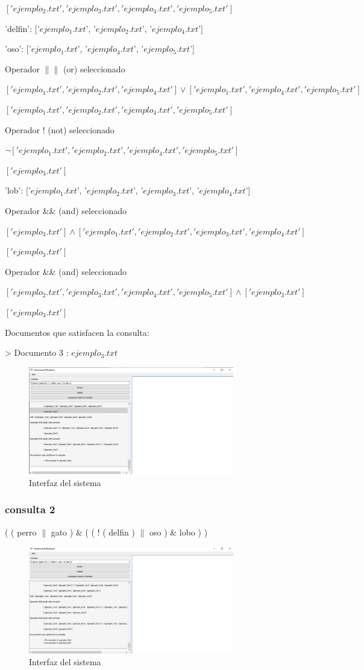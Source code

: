 $['ejemplo_2.txt', 'ejemplo_3.txt', 'ejemplo_4.txt', 'ejemplo_5.txt']$

'delfin': ['$ejemplo_1.txt$', '$ejemplo_2.txt$', '$ejemplo_4.txt$']

'oso': ['$ejemplo_1.txt$', '$ejemplo_4.txt$', '$ejemplo_5.txt$']

Operador $\|\|$ (or) seleccionado

$['ejemplo_1.txt', 'ejemplo_2.txt', 'ejemplo_4.txt'] \lor ['ejemplo_1.txt', 'ejemplo_4.txt', 'ejemplo_5.txt']$

$['ejemplo_1.txt', 'ejemplo_2.txt', 'ejemplo_4.txt', 'ejemplo_5.txt']$

Operador ! (not) seleccionado

$\neg['ejemplo_1.txt', 'ejemplo_2.txt', 'ejemplo_4.txt', 'ejemplo_5.txt']$

$['ejemplo_3.txt']$

'lob': ['$ejemplo_1.txt$', '$ejemplo_2.txt$', '$ejemplo_3.txt$', '$ejemplo_4.txt$']

Operador \&\& (and) seleccionado

$['ejemplo_3.txt'] \land ['ejemplo_1.txt', 'ejemplo_2.txt', 'ejemplo_3.txt', 'ejemplo_4.txt']$

$['ejemplo_3.txt']$

Operador \&\& (and) seleccionado

$['ejemplo_2.txt', 'ejemplo_3.txt', 'ejemplo_4.txt', 'ejemplo_5.txt'] \land ['ejemplo_3.txt']$

$['ejemplo_3.txt']$

Documentos que satisfacen la consulta:

> Documento 3 : $ejemplo_3.txt$

\begin{figure}[ht]
  \centering
  \includegraphics[width=0.8\textwidth]{src/img/ejecucion/4.png}
  \caption{Interfaz del sistema}
\end{figure}
\newpage
\subsubsection{consulta 2}
( ( perro $\|$ gato ) \& ( ( ! ( delfin ) $\|$ oso )  \&  lobo ) )
\begin{figure}[ht]
  \centering
  \includegraphics[width=0.8\textwidth]{src/img/ejecucion/5.png}
  \caption{Interfaz del sistema}
\end{figure}

